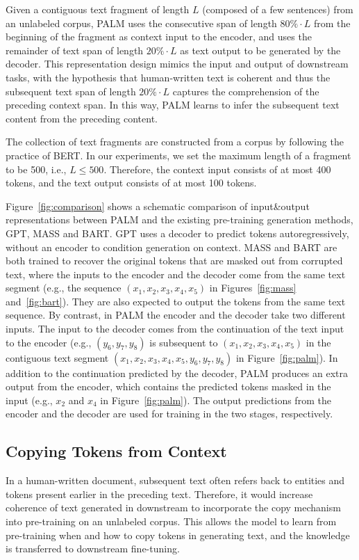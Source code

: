 \documentclass[11pt,a4paper]{article}
\newcommand{\method}{PALM\xspace}
\begin{document}
Given a contiguous text fragment of length $L$ (composed of a few sentences) from an unlabeled corpus, \method uses the consecutive span of length $80\%\cdot L$ from the beginning of the fragment as context input to the encoder, and uses the remainder of text span of length $20\%\cdot L$ as text output to be generated by the decoder. This representation design mimics the input and output of downstream tasks, with the hypothesis that human-written text is coherent and thus the subsequent text span of length $20\%\cdot L$ captures the comprehension of the preceding context span. In this way, \method learns to infer the subsequent text content from the preceding content.

The collection of text fragments are constructed from a corpus by following the practice of BERT. In our experiments, we set the maximum length of a fragment to be 500, i.e., $L\leq 500$. Therefore, the context input consists of at most 400 tokens, and the text output consists of at most 100 tokens.

Figure~\ref{fig:comparison} shows a schematic comparison of input\&output representations between \method and the existing pre-training generation methods, GPT, MASS and BART. GPT uses a decoder to predict tokens autoregressively, without an encoder to condition generation on context. MASS and BART are both trained to recover the original tokens that are masked out from corrupted text, where the inputs to the encoder and the decoder come from the same text segment (e.g., the sequence $(x_1,x_2,x_3,x_4,x_5)$ in Figures~\ref{fig:mass} and~\ref{fig:bart}). They are also expected to output the tokens from the same text sequence. By contrast, in \method the encoder and the decoder take two different inputs. The input to the decoder comes from the continuation of the text input to the encoder (e.g., $(y_6,y_7,y_8)$ is subsequent to $(x_1,x_2,x_3,x_4,x_5)$ in the contiguous text segment $(x_1,x_2,x_3,x_4,x_5,y_6,y_7,y_8)$ in Figure~\ref{fig:palm}). In addition to the continuation predicted by the decoder, \method produces an extra output from the encoder, which contains the predicted tokens masked in the input (e.g., $x_2$ and $x_4$ in Figure~\ref{fig:palm}). The output predictions from the encoder and the decoder are used for training in the two stages, respectively.

\subsection{Copying Tokens from Context}
In a human-written document, subsequent text often refers back to entities and tokens present earlier in the preceding text. Therefore, it would increase coherence of text generated in downstream to incorporate the copy mechanism into pre-training on an unlabeled corpus. This allows the model to learn from pre-training when and how to copy tokens in generating text, and the knowledge is transferred to downstream fine-tuning.
\end{document}
